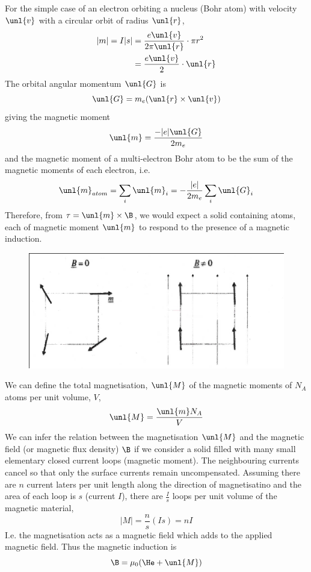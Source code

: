 \documentclass[a4paper, 11pt, normalem]{report}
\begin{document}
For the simple case of an electron orbiting a nucleus (Bohr atom) with velocity $\unl{v}$ with a circular orbit of radius $\unl{r}$,
\begin{align}
    |m| = I|s| &= \frac{e\unl{v}}{2\pi \unl{r}} \cdot \pi r^2 \\
               &= \frac{e\unl{v}}{2}\cdot\unl{r}
\end{align}
The orbital angular momentum $\unl{G}$ is 
\begin{equation}
    \unl{G} = m_e(\unl{r}\times \unl{v})
\end{equation}
giving the magnetic moment
\begin{equation}
    \unl{m} = \frac{-|e|\unl{G}}{2m_e}
\end{equation}
and the magnetic moment of a multi-electron Bohr atom to be the sum of the magnetic moments of each electron, i.e.
\begin{equation}
    \unl{m}_{atom} = \sum_i \unl{m}_i = -\frac{|e|}{2m_e}\sum_i \unl{G}_i
\end{equation}
Therefore, from $\tau = \unl{m}\times\B$, we would expect a solid containing atoms, each of magnetic moment $\unl{m}$ to respond to the presence of a magnetic induction. 
\begin{figure}[H]
    \centering
    \includegraphics[scale=0.5]{torque.png}
\end{figure}
We can define the total magnetisation, $\unl{M}$ of the magnetic moments of $N_A$ atoms per unit volume, $V$,
\begin{equation}
    \unl{M} = \frac{\unl{m}N_A}{V}
\end{equation}
We can infer the relation between the magnetisation $\unl{M}$ and the magnetic field (or magnetic flux density) $\B$ if we consider a solid filled with many small elementary closed current loops (magnetic moment). 
The neighbouring currents cancel so that only the surface currents remain uncompensated. 
Assuming there are $n$ current laters per unit length along the direction of magnetisatino and the area of each loop is $s$ (current $I$), there are $\frac{I}{s}$ loops per unit volume of the magnetic material, 
\begin{equation}
    |M| = \frac{n}{s}(Is) = nI
\end{equation}
I.e. the magnetisation acts as a magnetic field which adds to the applied magnetic field.
Thus the magnetic induction is
\begin{equation}
    \B = \mu_0(\He+\unl{M})
\end{equation}
\end{document}
